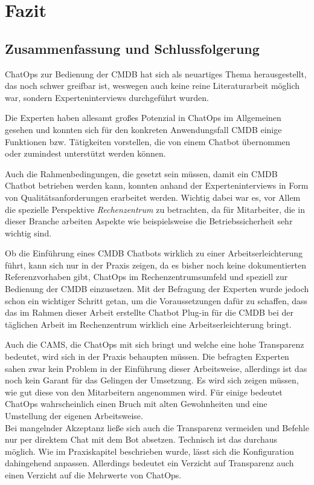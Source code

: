 \chapter{Fazit} \label{Fazit}

\section{Zusammenfassung und Schlussfolgerung}
ChatOps zur Bedienung der \acs{CMDB} hat sich als neuartiges Thema herausgestellt, das noch schwer greifbar ist, weswegen auch keine reine Literaturarbeit möglich war, sondern Experteninterviews durchgeführt wurden.

Die Experten haben allesamt großes Potenzial in ChatOps im Allgemeinen gesehen und konnten sich für den konkreten Anwendungsfall \acs{CMDB} einige Funktionen bzw. Tätigkeiten  vorstellen, die von einem Chatbot übernommen oder zumindest unterstützt werden können.

Auch die Rahmenbedingungen, die gesetzt sein müssen, damit ein \acs{CMDB} Chatbot betrieben werden kann, konnten anhand der Experteninterviews in Form von Qualitätsanforderungen erarbeitet werden. Wichtig dabei war es, vor Allem die spezielle Perspektive \textit{Rechenzentrum} zu betrachten, da für Mitarbeiter, die in dieser Branche arbeiten Aspekte wie beispielsweise die Betriebssicherheit sehr wichtig sind. %

Ob die Einführung eines \acs{CMDB} Chatbots wirklich zu einer Arbeitserleichterung führt, kann sich nur in der Praxis zeigen, da es bisher noch keine dokumentierten Referenzvorhaben gibt, ChatOps im Rechenzentrumsumfeld und speziell zur Bedienung der \acs{CMDB} einzusetzen. Mit der Befragung der Experten wurde jedoch schon ein wichtiger Schritt getan, um die Voraussetzungen dafür zu schaffen, dass das im Rahmen dieser Arbeit erstellte Chatbot Plug-in für die \acs{CMDB} bei der täglichen Arbeit im Rechenzentrum wirklich eine Arbeitserleichterung bringt.

Auch die \acl{CAMS}, die ChatOps mit sich bringt und welche eine hohe Transparenz bedeutet, wird sich in der Praxis behaupten müssen. Die befragten Experten sahen zwar kein Problem in der Einführung dieser Arbeitsweise, allerdings ist das noch kein Garant für das Gelingen der Umsetzung. Es wird sich zeigen müssen, wie gut diese von den Mitarbeitern angenommen wird. Für einige bedeutet ChatOps wahrscheinlich einen Bruch mit alten Gewohnheiten und eine Umstellung der eigenen Arbeitsweise.\\
Bei mangelnder Akzeptanz ließe sich auch die Transparenz vermeiden und Befehle nur per direktem Chat mit dem Bot absetzen. Technisch ist das durchaus möglich. Wie im Praxiskapitel beschrieben wurde, lässt sich die Konfiguration dahingehend anpassen. Allerdings bedeutet ein Verzicht auf Transparenz auch einen Verzicht auf die Mehrwerte von ChatOps.

